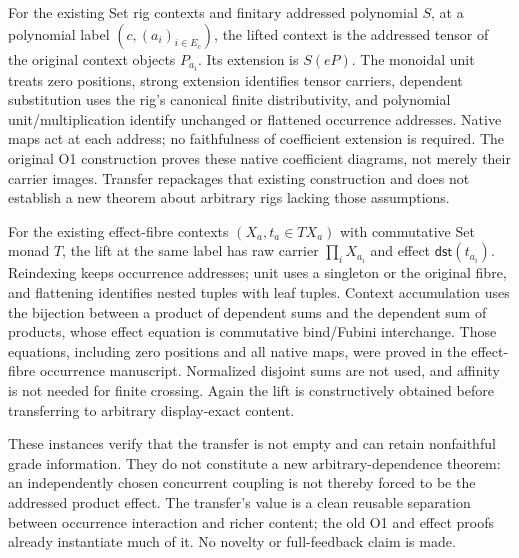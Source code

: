 \documentclass[11pt]{article}
\begin{document}
For the existing Set rig contexts and finitary addressed polynomial $S$, at a polynomial label $(c,(a_i)_{i\in E_c})$, the lifted context is the addressed tensor of the original context objects $P_{a_i}$. Its extension is $S(eP)$. The monoidal unit treats zero positions, strong extension identifies tensor carriers, dependent substitution uses the rig's canonical finite distributivity, and polynomial unit/multiplication identify unchanged or flattened occurrence addresses. Native maps act at each address; no faithfulness of coefficient extension is required. The original O1 construction proves these native coefficient diagrams, not merely their carrier images. Transfer repackages that existing construction and does not establish a new theorem about arbitrary rigs lacking those assumptions.

For the existing effect-fibre contexts $(X_a,t_a\in TX_a)$ with commutative Set monad $T$, the lift at the same label has raw carrier $\prod_iX_{a_i}$ and effect $\mathsf{dst}(t_{a_i})$. Reindexing keeps occurrence addresses; unit uses a singleton or the original fibre, and flattening identifies nested tuples with leaf tuples. Context accumulation uses the bijection between a product of dependent sums and the dependent sum of products, whose effect equation is commutative bind/Fubini interchange. Those equations, including zero positions and all native maps, were proved in the effect-fibre occurrence manuscript. Normalized disjoint sums are not used, and affinity is not needed for finite crossing. Again the lift is constructively obtained before transferring to arbitrary display-exact content.

These instances verify that the transfer is not empty and can retain nonfaithful grade information. They do not constitute a new arbitrary-dependence theorem: an independently chosen concurrent coupling is not thereby forced to be the addressed product effect. The transfer's value is a clean reusable separation between occurrence interaction and richer content; the old O1 and effect proofs already instantiate much of it. No novelty or full-feedback claim is made.
\end{document}
